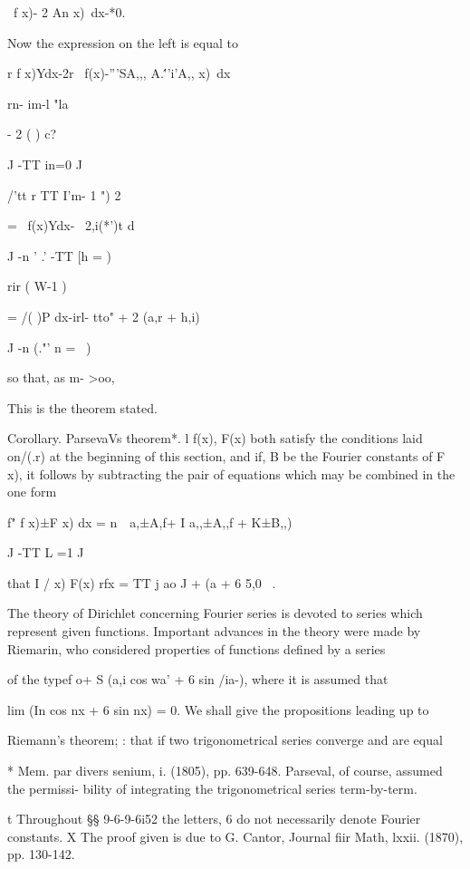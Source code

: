 \ f x)- 2 An x)\ dx-*0.

Now the expression on the left is equal to

r f x)Ydx-2r \ f(x)-'''SA,,, A.\'''i'A,, x)\ dx

rn- im-l "la

- 2 ( ) c?

J -TT in=0 J

/'tt r TT I'm- 1 ") 2

 = \ f(x)Ydx- \ 2,i(*')t d

J -n ' .' -TT [h = )

rir ( W-1 )

= /( )P dx-irl- tto" + 2 (a,r + h,i) \,

J -n (."' n = \ )

so that, as m- >oo,

This is the theorem stated.

Corollary. ParsevaVs theorem*. l f(x), F(x) both satisfy the
conditions laid on/(.r) at the beginning of this section, and if, B
be the Fourier constants of F x), it follows by subtracting the pair
of equations which may be combined in the one form

f" f x)±F x) dx = n\ \ a,±A,f+ I a,,±A,,f + K±B,,) \

J -TT L =1 J

that I / x) F(x) rfx = TT j ao J + (a + 6 5,0 \ .


The theory of Dirichlet concerning Fourier series is devoted to series
which represent given functions. Important advances in the theory were
made by Riemarin, who considered properties of functions defined by a
series

of the typef o+ S (a,i cos wa' + 6 sin /ia-), where it is assumed that

lim (In cos nx + 6 sin nx) = 0. We shall give the propositions leading
up to

Riemann's theorem; : that if two trigonometrical series converge and
are equal

* Mem. par divers senium, i. (1805), pp. 639-648. Parseval, of course,
assumed the permissi- bility of integrating the trigonometrical series
term-by-term.

t Throughout §§ 9-6-9-6i52 the letters, 6 do not necessarily denote
Fourier constants. X The proof given is due to G. Cantor, Journal fiir
Math, lxxii. (1870), pp. 130-142.

%
%

